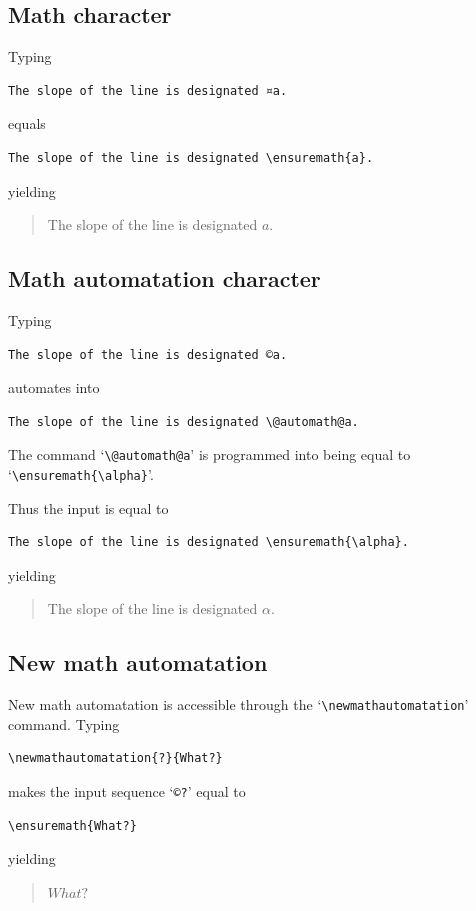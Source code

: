 \documentclass[a4paper,british,parskip=half,11pt,fleqn]{scrartcl}
\begin{document}
\subsection{Math character}
\label{sec:math-character}

Typing 
\begin{verbatim}
The slope of the line is designated ¤a.
\end{verbatim}
equals
\begin{verbatim}
The slope of the line is designated \ensuremath{a}.
\end{verbatim}
yielding
\begin{quote}
  The slope of the line is designated \ensuremath{a}.
\end{quote}

\subsection{Math automatation character}
\label{sec:math-autom-char}

Typing 
\begin{verbatim}
The slope of the line is designated ©a.
\end{verbatim}
automates into
\begin{verbatim}
The slope of the line is designated \@automath@a.
\end{verbatim}
The command `\verb|\@automath@a|' is programmed into being equal to `\verb|\ensuremath{\alpha}|'.

Thus the input is equal to
\begin{verbatim}
The slope of the line is designated \ensuremath{\alpha}.
\end{verbatim}
yielding
\begin{quote}
The slope of the line is designated \ensuremath{\alpha}.
\end{quote}

\subsection{New math automatation}
\label{sec:new-math-shortcuts}

New math automatation is accessible through the
`\verb|\newmathautomatation|' command. Typing
\begin{verbatim}
\newmathautomatation{?}{What?}
\end{verbatim}
makes the input sequence `\verb|©?|' equal to
\begin{verbatim}
\ensuremath{What?}
\end{verbatim}
yielding
\begin{quote}
\ensuremath{What?}
\end{quote}
\end{document}
